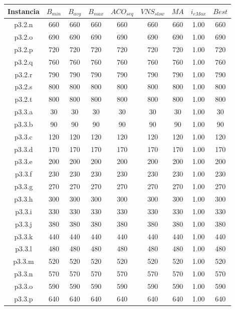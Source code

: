 \begin{table}
\begin{center}
\begin{tabular}{ |c|c|c|c|c|c|c|c|c| } 
\hline
Instancia & $B_{min}$ & $B_{avg}$ & $B_{max}$ & $ACO_{seq}$ & $VNS_{slow}$ & $MA$ & $i_{eMax}$ & $Best$ \\
\hline
p3.2.n & 660 & 660 & 660 & 660 & 660 & 660 & 1.00 & 660  \\
p3.2.o & 690 & 690 & 690 & 690 & 690 & 690 & 1.00 & 690  \\
p3.2.p & 720 & 720 & 720 & 720 & 720 & 720 & 1.00 & 720  \\
p3.2.q & 760 & 760 & 760 & 760 & 760 & 760 & 1.00 & 760  \\
p3.2.r & 790 & 790 & 790 & 790 & 790 & 790 & 1.00 & 790  \\
p3.2.s & 800 & 800 & 800 & 800 & 800 & 800 & 1.00 & 800  \\
p3.2.t & 800 & 800 & 800 & 800 & 800 & 800 & 1.00 & 800  \\
p3.3.a & 30 & 30 & 30 & 30 & 30 & 30 & 1.00 & 30  \\
p3.3.b & 90 & 90 & 90 & 90 & 90 & 90 & 1.00 & 90  \\
p3.3.c & 120 & 120 & 120 & 120 & 120 & 120 & 1.00 & 120  \\
p3.3.d & 170 & 170 & 170 & 170 & 170 & 170 & 1.00 & 170  \\
p3.3.e & 200 & 200 & 200 & 200 & 200 & 200 & 1.00 & 200  \\
p3.3.f & 230 & 230 & 230 & 230 & 230 & 230 & 1.00 & 230  \\
p3.3.g & 270 & 270 & 270 & 270 & 270 & 270 & 1.00 & 270  \\
p3.3.h & 300 & 300 & 300 & 300 & 300 & 300 & 1.00 & 300  \\
p3.3.i & 330 & 330 & 330 & 330 & 330 & 330 & 1.00 & 330  \\
p3.3.j & 380 & 380 & 380 & 380 & 380 & 380 & 1.00 & 380  \\
p3.3.k & 440 & 440 & 440 & 440 & 440 & 440 & 1.00 & 440  \\
p3.3.l & 480 & 480 & 480 & 480 & 480 & 480 & 1.00 & 480  \\
p3.3.m & 520 & 520 & 520 & 520 & 520 & 520 & 1.00 & 520  \\
p3.3.n & 570 & 570 & 570 & 570 & 570 & 570 & 1.00 & 570  \\
p3.3.o & 590 & 590 & 590 & 590 & 590 & 590 & 1.00 & 590  \\
p3.3.p & 640 & 640 & 640 & 640 & 640 & 640 & 1.00 & 640  \\

\end{tabular}
\end{center}
\end{table}
